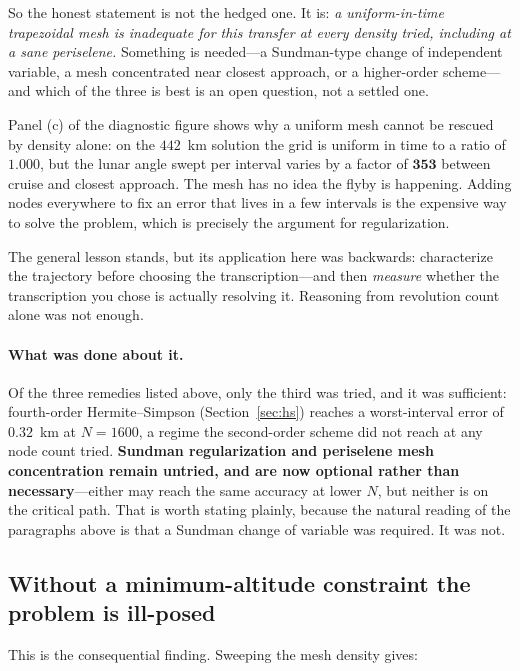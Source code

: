 \documentclass[11pt]{article}
\begin{document}
So the honest statement is not the hedged one. It is: \emph{a uniform-in-time
trapezoidal mesh is inadequate for this transfer at every density tried,
including at a sane periselene.} Something is needed---a Sundman-type change of
independent variable, a mesh concentrated near closest approach, or a
higher-order scheme---and which of the three is best is an open question, not a
settled one.

Panel (c) of the diagnostic figure shows why a uniform mesh cannot be rescued
by density alone: on the $442$~km solution the grid is uniform in time to a
ratio of $1.000$, but the lunar angle swept per interval varies by a factor of
$\mathbf{353}$ between cruise and closest approach. The mesh has no idea the
flyby is happening. Adding nodes everywhere to fix an error that lives in a few
intervals is the expensive way to solve the problem, which is precisely the
argument for regularization.

The general lesson stands, but its application here was backwards: characterize
the trajectory before choosing the transcription---and then \emph{measure}
whether the transcription you chose is actually resolving it. Reasoning from
revolution count alone was not enough.

\paragraph{What was done about it.} Of the three remedies listed above, only
the third was tried, and it was sufficient: fourth-order Hermite--Simpson
(Section~\ref{sec:hs}) reaches a worst-interval error of $0.32$~km at
$N = 1600$, a regime the second-order scheme did not reach at any node count
tried. \textbf{Sundman regularization and periselene mesh concentration remain
untried, and are now optional rather than necessary}---either may reach the same
accuracy at lower $N$, but neither is on the critical path. That is worth
stating plainly, because the natural reading of the paragraphs above is that a
Sundman change of variable was required. It was not.

\subsection{Without a minimum-altitude constraint the problem is ill-posed}
\label{sec:illposed}

This is the consequential finding. Sweeping the mesh density gives:
\end{document}
